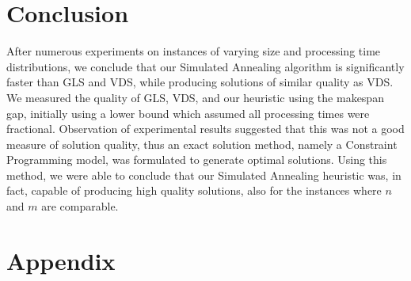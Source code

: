 \documentclass[12pt,a4paper,reqno]{article}
\begin{document}
\section{Conclusion}
After numerous experiments on instances of varying size and processing time distributions, we conclude that our Simulated Annealing algorithm is significantly faster than GLS and VDS, while producing solutions of similar quality as VDS. We measured the quality of GLS, VDS, and our heuristic using the makespan gap, initially using a lower bound which assumed all processing times were fractional. Observation of experimental results suggested that this was not a good measure of solution quality, thus an exact solution method, namely a Constraint Programming model, was formulated to generate optimal solutions. Using this method, we were able to conclude that our Simulated Annealing heuristic was, in fact, capable of producing high quality solutions, also for the instances where $n$ and $m$ are comparable.


\newpage
{}


\newpage

\section{Appendix}
\end{document}
